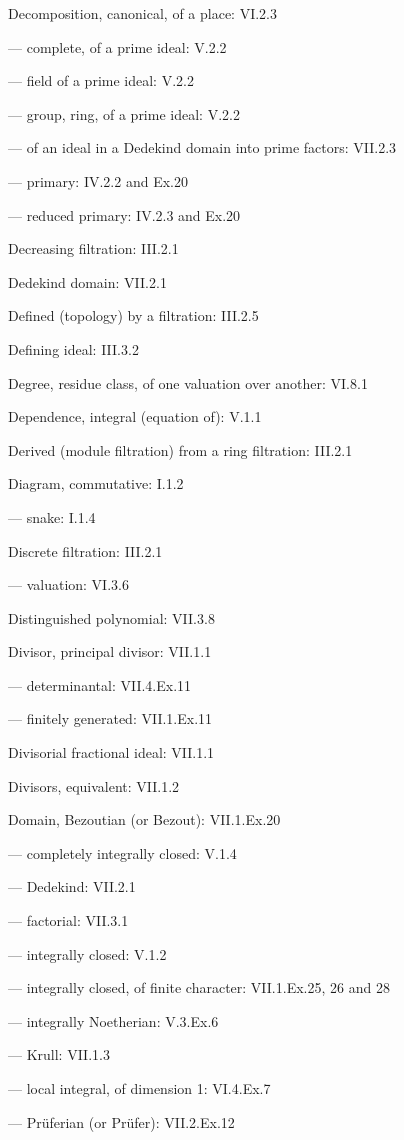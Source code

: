 Decomposition, canonical, of a place: VI.2.3

--- complete, of a prime ideal: V.2.2

--- field of a prime ideal: V.2.2

--- group, ring, of a prime ideal: V.2.2

--- of an ideal in a Dedekind domain into prime factors: VII.2.3

--- primary: IV.2.2 and Ex.20

--- reduced primary: IV.2.3 and Ex.20

Decreasing filtration: III.2.1

Dedekind domain: VII.2.1

Defined (topology) by a filtration: III.2.5

Defining ideal: III.3.2

Degree, residue class, of one valuation over another: VI.8.1

Dependence, integral (equation of): V.1.1

Derived (module filtration) from a ring filtration: III.2.1

Diagram, commutative: I.1.2

--- snake: I.1.4

Discrete filtration: III.2.1

--- valuation: VI.3.6

Distinguished polynomial: VII.3.8

Divisor, principal divisor: VII.1.1

--- determinantal: VII.4.Ex.11

--- finitely generated: VII.1.Ex.11

Divisorial fractional ideal: VII.1.1

Divisors, equivalent: VII.1.2

Domain, Bezoutian (or Bezout): VII.1.Ex.20

--- completely integrally closed: V.1.4

--- Dedekind: VII.2.1

--- factorial: VII.3.1

--- integrally closed: V.1.2

--- integrally closed, of finite character: VII.1.Ex.25, 26 and 28

--- integrally Noetherian: V.3.Ex.6

--- Krull: VII.1.3

--- local integral, of dimension 1: VI.4.Ex.7

--- Prüferian (or Prüfer): VII.2.Ex.12

